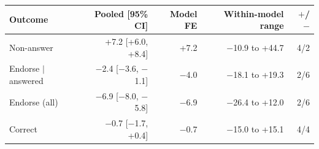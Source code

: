 \begin{tabular}{lrrrr}
\toprule
Outcome & Pooled [95\% CI] & Model FE & Within-model range & $+$/$-$ \\
\midrule
Non-answer & +7.2 [+6.0, +8.4] & +7.2 & $-$10.9 to +44.7 & 4/2 \\
Endorse $\mid$ answered & $-$2.4 [$-$3.6, $-$1.1] & $-$4.0 & $-$18.1 to +19.3 & 2/6 \\
Endorse (all) & $-$6.9 [$-$8.0, $-$5.8] & $-$6.9 & $-$26.4 to +12.0 & 2/6 \\
Correct & $-$0.7 [$-$1.7, +0.4] & $-$0.7 & $-$15.0 to +15.1 & 4/4 \\
\bottomrule
\end{tabular}
